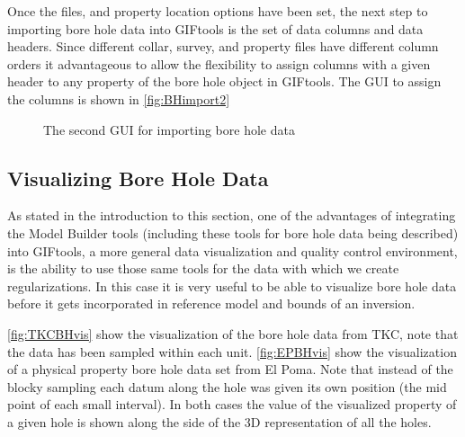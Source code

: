 Once the files, and property location options have been set, the next step to importing bore hole data into GIFtools is the set of data columns and data headers. Since different collar, survey, and property files have different column orders it advantageous to allow the flexibility to assign columns with a given header to any property of the bore hole object in GIFtools. The \ac{GUI} to assign the columns is shown in \autoref{fig:BHimport2}

 \begin{figure} [h]
    \centering
    \caption{The second \ac{GUI} for importing bore hole data}
    \label{fig:BHimport2}
\end{figure}

\subsection{Visualizing Bore Hole Data}
\label{subsec:visBH}

As stated in the introduction to this section, one of the advantages of integrating the Model Builder tools (including these tools for bore hole data being described) into GIFtools, a more general data visualization and quality control environment, is the ability to use those same tools for the data with which we create regularizations. In this case it is very useful to be able to visualize bore hole data before it gets incorporated in reference model and bounds of an inversion. 

\autoref{fig:TKCBHvis} show the visualization of the bore hole data from TKC, note that the data has been sampled within each unit.  \autoref{fig:EPBHvis} show the visualization of a physical property bore hole data set from El Poma. Note that instead of the blocky sampling each datum along the hole was given its own position (the mid point of each small interval). In both cases the value of the visualized property of a given hole is shown along the side of the 3D representation of all the holes.


